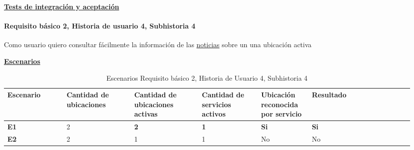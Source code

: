 \documentclass[../ei103948-project-documentation.tex]{subfiles}
\begin{document}
						\begin{center}
							\textbf{\underline{Tests de integración y aceptación}}
						\end{center}
	
						\testBasicoR

						\newpage


					\paragraph*{Requisito básico 2, Historia de usuario 4, Subhistoria 4}
					Como usuario quiero consultar fácilmente la información de las \underline{noticias} sobre un una ubicación activa

					\begin{center}
						\textbf{\underline{Escenarios}}
						\begin{table}[H]
							\centering
							\begin{tabular}{|p{0.14\linewidth}|p{0.16\linewidth}|p{0.16\linewidth}|p{0.14\linewidth}|p{0.12\linewidth}|p{0.12\linewidth}|p{0.12\linewidth}|}
								\hline
								\textbf{Escenario} & \textbf{Cantidad de ubicaciones} & \textbf{Cantidad de ubicaciones activas} & \textbf{Cantidad de servicios activos} & \textbf{Ubicación reconocida por servicio} & \textbf{Resultado} \\ \hline
								\textbf{E1}        & 2                                & \textbf{2}                               & \textbf{1}                             & \textbf{Si}                                & \textbf{Si}        \\ \hline
								\textbf{E2}        & 2                                & 1                                        & 1                                      & No                                         & No                 \\ \hline
								\end{tabular}
							\caption{Escenarios Requisito básico 2, Historia de Usuario 4, Subhistoria 4}
						\end{table}

						\descripcionBasicaS


\end{center}
\end{document}

